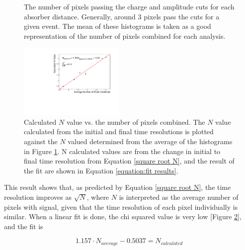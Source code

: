 \documentclass[twocolumn,aps,prd,reprint]{revtex4-1}
\begin{document}
\begin{figure}[!htbp]
\caption{The number of pixels passing the charge and amplitude cuts for each absorber distance. Generally, around 3 pixels pass the cuts for a given event. The mean of these histograms is taken as a good representation of the number of pixels combined for each analysis.}
\label{pixels average}
\end{figure}

\begin{figure}[!htbp]
\centering
\includegraphics[width = 0.45\textwidth]{time_res_sqrt_n}
\caption{Calculated $N$ value vs. the number of pixels combined. The $N$ value calculated from the initial and final time resolutions is plotted against the $N$ valued determined from the average of the histograms in Figure \ref{pixels average}. N calculated values are from the change in initial to final time resolution from Equation \ref{square root N}, and the result of the fit are shown in Equation \ref{equation:fit results}.}
\label{linear fit N}
\end{figure}

This result shows that, as predicted by Equation \ref{square root N}, the time resolution improves as $\sqrt{N}$, where $N$ is interpreted as the average number of pixels with signal, given that the time resolution of each pixel individually is similar. When a linear fit is done, the chi squared value is very low [Figure \ref{linear fit N}], and the fit is 

\begin{equation}
1.157 \cdot N_{average} - 0.5037 = N_{calculated}
\label{equation:fit results}
\end{equation}
\end{document}
